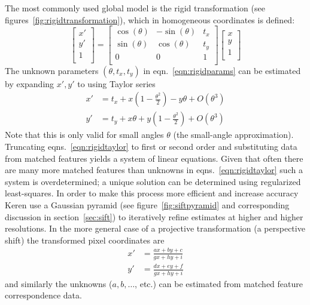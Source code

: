 The most commonly used global model is the rigid transformation (see figures~\ref{fig:rigidtransformation}), which in homogeneous coordinates is defined:
\begin{equation}
	\begin{bmatrix}
		x' \\
		y' \\
		1  \\
	\end{bmatrix} =
	\begin{bmatrix}
		\cos(\theta) & -\sin(\theta) & t_x \\
		\sin(\theta) & \cos(\theta)  & t_y \\
		0            & 0             & 1   \\
	\end{bmatrix}
	\begin{bmatrix}
		x \\
		y \\
		1 \\
	\end{bmatrix}
	\label{eqn:rigidparams}
\end{equation}
The unknown parameters \((\theta, t_x, t_y)\) in eqn.~\eqref{eqn:rigidparams} can be estimated by expanding \(x', y'\) to using Taylor series
\begin{equation}
	\begin{split}
		x' &= t_x + x\left( 1 - \frac{\theta^2}{2} \right) - y\theta  + O(\theta^3) \\
		y' &= t_y + x \theta  + y\left( 1 - \frac{\theta^2}{2} \right) + O(\theta^3)
	\end{split}
	\label{eqn:rigidtaylor}
\end{equation}
Note that this is only valid for small angles \(\theta\) (the small-angle approximation\cite{keren1988}).
%
Truncating eqns.~\eqref{eqn:rigidtaylor} to first or second order and substituting data from matched features yields a system of linear equations.
%
Given that often there are many more matched features than unknowns in eqns.~\eqref{eqn:rigidtaylor} such a system is overdetermined; a unique solution can be determined using regularized least-squares.
%
In order to make this process more efficient and increase accuracy Keren \etal\cite{keren1988} use a Gaussian pyramid (see figure~\ref{fig:siftpyramid} and corresponding discussion in section~\ref{sec:sift}) to iteratively refine estimates at higher and higher resolutions.
%
In the more general case of a projective transformation (a perspective shift) the transformed pixel coordinates are
\begin{equation}
	\begin{split}
		x' & = \frac{ax+by+c}{gx+hy+i} \\
		y' & = \frac{dx+ey+f}{gx+hy+i}
		\label{eqn:projectivetf}
	\end{split}
\end{equation}
and similarly the unknowns (\(a,b,\dots\), etc.) can be estimated from matched feature correspondence data.

